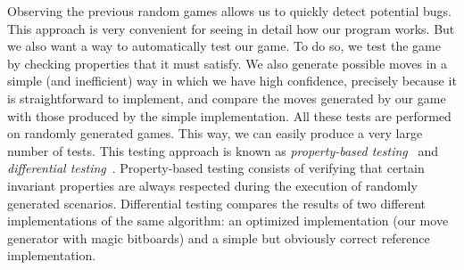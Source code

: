 \documentclass[12pt,a4paper,twoside,openright]{book}
\begin{document}

Observing the previous random games allows us to quickly detect potential bugs. This approach is very convenient for seeing in detail how our program works. But we also want a way to automatically test our game. To do so, we test the game by checking properties that it must satisfy. We also generate possible moves in a simple (and inefficient) way in which we have high confidence, precisely because it is straightforward to implement, and compare the moves generated by our game with those produced by the simple implementation. All these tests are performed on randomly generated games. This way, we can easily produce a very large number of tests. This testing approach is known as \emph{property-based testing}~\cite{claessen2000quickcheck} and \emph{differential testing}~\cite{mckeeman1998differential}. Property-based testing consists of verifying that certain invariant properties are always respected during the execution of randomly generated scenarios. Differential testing compares the results of two different implementations of the same algorithm: an optimized implementation (our move generator with magic bitboards) and a simple but obviously correct reference implementation.\\
\end{document}
